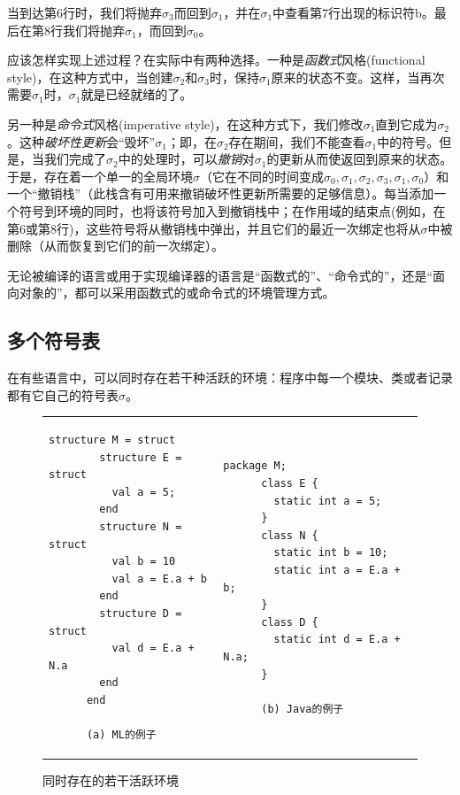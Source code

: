 \documentclass[cn,11pt,chinese]{elegantbook}
\begin{document}
当到达第6行时，我们将抛弃$\sigma_3$而回到$\sigma_1$，并在$\sigma_1$中查看第7行出现的标识符b。最后在第8行我们将抛弃$\sigma_1$，而回到$\sigma_0$。

应该怎样实现上述过程？在实际中有两种选择。一种是\textit{函数式}风格(functional style)，在这种方式中，当创建$\sigma_2$和$\sigma_3$时，保持$\sigma_1$原来的状态不变。这样，当再次需要$\sigma_1$时，$\sigma_1$就是已经就绪的了。

另一种是\textit{命令式}风格(imperative style)，在这种方式下，我们修改$\sigma_1$直到它成为$\sigma_2$。这种\textit{破坏性更新}会“毁坏”$\sigma_1$；即，在$\sigma_2$存在期间，我们不能查看$\sigma_1$中的符号。但是，当我们完成了$\sigma_2$中的处理时，可以\textit{撤销}对$\sigma_1$的更新从而使返回到原来的状态。于是，存在着一个单一的全局环境$\sigma$（它在不同的时间变成$\sigma_0,\sigma_1,\sigma_2,\sigma_3,\sigma_1,\sigma_0$）和一个“撤销栈”（此栈含有可用来撤销破坏性更新所需要的足够信息）。每当添加一个符号到环境的同时，也将该符号加入到撤销栈中；在作用域的结束点(例如，在第6或第8行)，这些符号将从撤销栈中弹出，并且它们的最近一次绑定也将从$\sigma$中被删除（从而恢复到它们的前一次绑定）。

无论被编译的语言或用于实现编译器的语言是“函数式的”、“命令式的”，还是“面向对象的”，都可以采用函数式的或命令式的环境管理方式。

\subsection{多个符号表}

在有些语言中，可以同时存在若干种活跃的环境：程序中每一个模块、类或者记录都有它自己的符号表$\sigma$。

\begin{figure}[htbp]
  \centering
  \begin{tabular}{p{6cm}p{6cm}}
    \begin{lstlisting}[frame=none]
      structure M = struct
        structure E = struct
          val a = 5;
        end
        structure N = struct
          val b = 10
          val a = E.a + b
        end
        structure D = struct
          val d = E.a + N.a
        end
      end

      (a) ML的例子
    \end{lstlisting}
    &
    \begin{lstlisting}[frame=none]
      package M;
      class E {
        static int a = 5;
      }
      class N {
        static int b = 10;
        static int a = E.a + b;
      }
      class D {
        static int d = E.a + N.a;
      }

      (b) Java的例子
    \end{lstlisting}
  \end{tabular}
  \caption{同时存在的若干活跃环境}
  \label{fig:5-1}
\end{figure}
\end{document}

